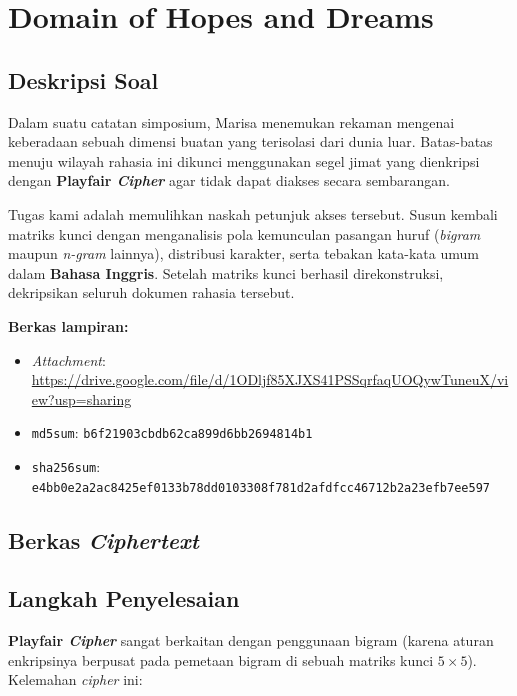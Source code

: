 \section{Domain of Hopes and Dreams}

\subsection*{Deskripsi Soal}

Dalam suatu catatan simposium, Marisa menemukan rekaman mengenai keberadaan
sebuah dimensi buatan yang terisolasi dari dunia luar. Batas-batas menuju
wilayah rahasia ini dikunci menggunakan segel jimat yang dienkripsi dengan
\textbf{Playfair \textit{Cipher}} agar tidak dapat diakses secara sembarangan.

Tugas kami adalah memulihkan naskah petunjuk akses tersebut. Susun kembali
matriks kunci dengan menganalisis pola kemunculan pasangan huruf (\textit{bigram}
maupun \textit{n-gram} lainnya), distribusi karakter, serta tebakan kata-kata
umum dalam \textbf{Bahasa Inggris}. Setelah matriks kunci berhasil
direkonstruksi, dekripsikan seluruh dokumen rahasia tersebut.

\medskip
\noindent\textbf{Berkas lampiran:}
\begin{itemize}[nosep]
  \item \textit{Attachment}: \url{https://drive.google.com/file/d/1ODljf85XJXS41PSSqrfaqUOQywTuneuX/view?usp=sharing}
  \item \texttt{md5sum}: \texttt{b6f21903cbdb62ca899d6bb2694814b1}
  \item \texttt{sha256sum}: \texttt{e4bb0e2a2ac8425ef0133b78dd0103308f781d2afdfcc46712b2a23efb7ee597}
\end{itemize}

\subsection*{Berkas \textit{Ciphertext}}


\subsection*{Langkah Penyelesaian}

\textbf{Playfair \textit{Cipher}} sangat berkaitan dengan penggunaan bigram (karena aturan enkripsinya berpusat
pada pemetaan bigram di sebuah matriks kunci $5 \times 5$). Kelemahan \textit{cipher} ini:

